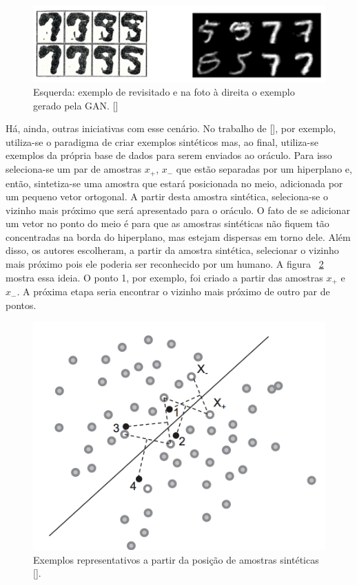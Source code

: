 \begin{figure}
  \centering
  \includegraphics[width=.9\textwidth]{figures/generative_GAN_AL_5_vs_9.png}
  \caption{Esquerda: exemplo de \cite{baum1992query} revisitado e na foto à direita o exemplo gerado pela GAN. [\cite{zhu2017generative}]}
  \label{fig:GAN_5_vs_9}
\end{figure}


Há, ainda, outras iniciativas com esse cenário. No trabalho de [\cite{wang2015active}], por exemplo, utiliza-se o paradigma de criar exemplos sintéticos mas, ao final, utiliza-se exemplos da própria base de dados para serem enviados ao oráculo. Para isso seleciona-se um par de amostras {$x_+$, $x_-$} que estão separadas por um hiperplano e, então, sintetiza-se uma amostra que estará posicionada no meio, adicionada por um pequeno vetor ortogonal. A partir desta amostra sintética, seleciona-se o vizinho mais próximo que será apresentado para o oráculo. O fato de se adicionar um vetor no ponto do meio é para que as amostras sintéticas não fiquem tão concentradas na borda do hiperplano, mas estejam dispersas em torno dele. Além disso, os autores escolheram, a partir da amostra sintética, selecionar o vizinho mais próximo pois ele poderia ser reconhecido por um humano. A figura ~\ref{fig:wang_2015_membership}  mostra essa ideia. O ponto 1, por exemplo, foi criado a partir das amostras $x_+$ e $x_-$. A próxima etapa seria encontrar o vizinho mais próximo de outro par de pontos.

\begin{figure}
  \centering
  \includegraphics[width=.5\textwidth]{figures/wang_2015_membership.png}
  \caption{Exemplos representativos a partir da posição de amostras sintéticas [\cite{wang2015active}].}
  \label{fig:wang_2015_membership}
\end{figure}


